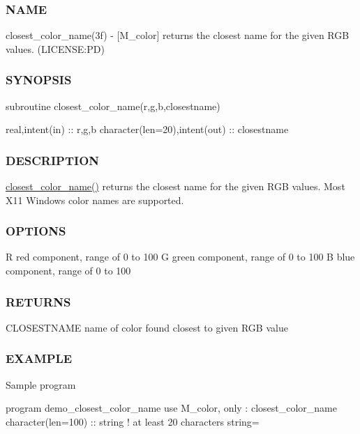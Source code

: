 \subsubsection*{N\+A\+ME}

closest\+\_\+color\+\_\+name(3f) -\/ \mbox{[}M\+\_\+color\mbox{]} returns the closest name for the given R\+GB values. (L\+I\+C\+E\+N\+SE\+:PD) 

\subsubsection*{S\+Y\+N\+O\+P\+S\+IS}

\begin{DoxyVerb}subroutine closest_color_name(r,g,b,closestname)

 real,intent(in)               :: r,g,b
 character(len=20),intent(out) :: closestname
\end{DoxyVerb}


\subsubsection*{D\+E\+S\+C\+R\+I\+P\+T\+I\+ON}

\mbox{\hyperlink{namespacem__color_acad72628ee0b77cf87f40cd46734fb18}{closest\+\_\+color\+\_\+name()}} returns the closest name for the given R\+GB values. Most X11 Windows color names are supported.

\subsubsection*{O\+P\+T\+I\+O\+NS}

R red component, range of 0 to 100 G green component, range of 0 to 100 B blue component, range of 0 to 100

\subsubsection*{R\+E\+T\+U\+R\+NS}

C\+L\+O\+S\+E\+S\+T\+N\+A\+ME name of color found closest to given R\+GB value

\subsubsection*{E\+X\+A\+M\+P\+LE}

Sample program

program demo\+\_\+closest\+\_\+color\+\_\+name use M\+\_\+color, only \+: closest\+\_\+color\+\_\+name character(len=100) \+:\+: string ! at least 20 characters string=\textquotesingle{} \textquotesingle{}

